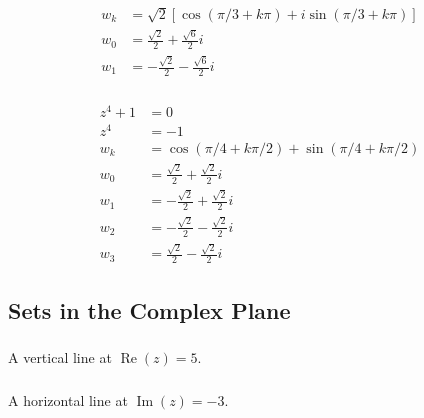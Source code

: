 \documentclass{article}
\renewcommand{\Im}{\operatorname{Im}}
\renewcommand{\Re}{\operatorname{Re}}
\begin{document}
\setcounter{subsubsection}{30}
\subsubsection{}

\begin{align*}
  w_k & = \sqrt{2} [\cos (\pi / 3 + k \pi) + i \sin (\pi / 3 + k \pi)] \\
  w_0 & = \frac{\sqrt{2}}{2} + \frac{\sqrt{6}}{2} i                    \\
  w_1 & = -\frac{\sqrt{2}}{2} - \frac{\sqrt{6}}{2} i
\end{align*}

\setcounter{subsubsection}{32}
\subsubsection{}

\begin{align*}
  z^4 + 1 & = 0                                                       \\
  z^4     & = -1                                                      \\
  w_k     & = \cos (\pi / 4 + k \pi / 2) + \sin (\pi / 4 + k \pi / 2) \\
  w_0     & = \frac{\sqrt{2}}{2} + \frac{\sqrt{2}}{2} i               \\
  w_1     & = -\frac{\sqrt{2}}{2} + \frac{\sqrt{2}}{2} i              \\
  w_2     & = -\frac{\sqrt{2}}{2} - \frac{\sqrt{2}}{2} i              \\
  w_3     & = \frac{\sqrt{2}}{2} - \frac{\sqrt{2}}{2} i
\end{align*}

\subsection{Sets in the Complex Plane}

\subsubsection{}

A vertical line at $\Re(z) = 5$.

\setcounter{subsubsection}{2}
\subsubsection{}

A horizontal line at $\Im(z) = -3$.
\end{document}
